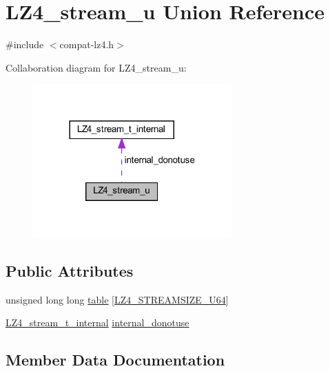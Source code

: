 \hypertarget{union_l_z4__stream__u}{}\section{L\+Z4\+\_\+stream\+\_\+u Union Reference}
\label{union_l_z4__stream__u}


{\ttfamily \#include $<$compat-\/lz4.\+h$>$}



Collaboration diagram for L\+Z4\+\_\+stream\+\_\+u\+:
\nopagebreak
\begin{figure}[H]
\begin{center}
\leavevmode
\includegraphics[width=216pt]{union_l_z4__stream__u__coll__graph}
\end{center}
\end{figure}
\subsection*{Public Attributes}
\begin{DoxyCompactItemize}
\item 
unsigned long long \hyperlink{union_l_z4__stream__u_adb230dc14b94f45f65fe5dcf2f4923cc}{table} \mbox{[}\hyperlink{compat-lz4_8h_acddbce79f3e1d413f295e97d986ab3f5}{L\+Z4\+\_\+\+S\+T\+R\+E\+A\+M\+S\+I\+Z\+E\+\_\+\+U64}\mbox{]}
\item 
\hyperlink{struct_l_z4__stream__t__internal}{L\+Z4\+\_\+stream\+\_\+t\+\_\+internal} \hyperlink{union_l_z4__stream__u_a0791f2829d7100e12eb5f99094d8855e}{internal\+\_\+donotuse}
\end{DoxyCompactItemize}


\subsection{Member Data Documentation}
\hypertarget{union_l_z4__stream__u_a0791f2829d7100e12eb5f99094d8855e}{}
